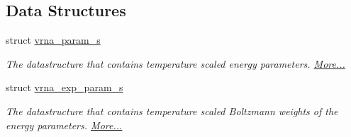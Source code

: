 \subsection*{Data Structures}
\begin{DoxyCompactItemize}
\item 
struct \hyperlink{group__energy__parameters_structvrna__param__s}{vrna\-\_\-param\-\_\-s}
\begin{DoxyCompactList}\small\item\em The datastructure that contains temperature scaled energy parameters.  \hyperlink{group__energy__parameters_structvrna__param__s}{More...}\end{DoxyCompactList}\item 
struct \hyperlink{group__energy__parameters_structvrna__exp__param__s}{vrna\-\_\-exp\-\_\-param\-\_\-s}
\begin{DoxyCompactList}\small\item\em The datastructure that contains temperature scaled Boltzmann weights of the energy parameters.  \hyperlink{group__energy__parameters_structvrna__exp__param__s}{More...}\end{DoxyCompactList}\end{DoxyCompactItemize}
